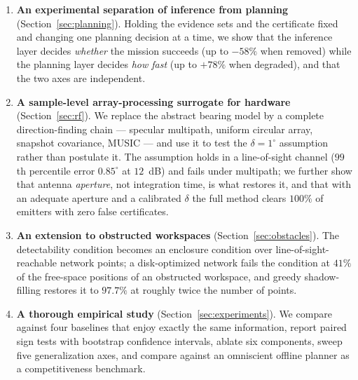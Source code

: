 \documentclass[journal,10pt]{IEEEtran}
\theoremstyle{definition}
\begin{document}
\begin{enumerate}
that the hard outer approximation is \emph{unsafe} once spurious bearings occur --- a $2\%$
spurious-bearing rate produces false absence certificates --- and that a $q$-relaxed intersection
with a separated absence path eliminates them. We further prove that sound \emph{and} complete
absence certification under $q$ outliers requires a detection redundancy $r>q$ that the covering
networks used here do not possess, which we state as an open network-design problem.
\item \textbf{An experimental separation of inference from planning}
(Section~\ref{sec:planning}). Holding the evidence sets and the certificate fixed and changing one
planning decision at a time, we show that the inference layer decides \emph{whether} the mission
succeeds (up to $-58\%$ when removed) while the planning layer decides \emph{how fast} (up to
$+78\%$ when degraded), and that the two axes are independent.
\item \textbf{A sample-level array-processing surrogate for hardware}
(Section~\ref{sec:rf}). We replace the abstract bearing model by a complete direction-finding
chain --- specular multipath, uniform circular array, snapshot covariance, MUSIC --- and use it to
test the $\delta=1^\circ$ assumption rather than postulate it. The assumption holds in a
line-of-sight channel ($99$th percentile error $0.85^\circ$ at $12$~dB) and fails under multipath;
we further show that antenna \emph{aperture}, not integration time, is what restores it, and that
with an adequate aperture and a calibrated $\delta$ the full method clears $100\%$ of emitters with
zero false certificates.
\item \textbf{An extension to obstructed workspaces} (Section~\ref{sec:obstacles}). The
detectability condition becomes an enclosure condition over line-of-sight-reachable network points;
a disk-optimized network fails the condition at $41\%$ of the free-space positions of an
obstructed workspace, and greedy shadow-filling restores it to $97.7\%$ at roughly twice the
number of points.
\item \textbf{A thorough empirical study} (Section~\ref{sec:experiments}). We compare against four
baselines that enjoy exactly the same information, report paired sign tests with bootstrap
confidence intervals, ablate six components, sweep five generalization axes, and compare against
an omniscient offline planner as a competitiveness benchmark.
\end{enumerate}

\end{document}
